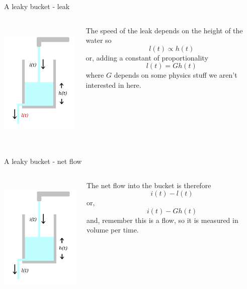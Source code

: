 \documentclass{beamer}
\newcommand{\crish}{\color{reddish}}
\newcommand{\cbla}{\color{black}}
\begin{document}
\begin{frame}{A leaky bucket - leak}
\begin{columns}
\begin{column}{0.5\textwidth}
  \begin{center}
     \includegraphics[height=6cm]{glass_l_red.png}      
     \end{center}
\end{column}
\begin{column}{0.5\textwidth}
  The speed of the leak depends on the height of the water so\crish
  $$l(t)\propto h(t)$$
  \cbla{}or, adding a constant of proportionality\crish
  $$l(t)=Gh(t)$$
  \cbla{}where \crish{}$G$\cbla{} depends on some physics stuff we aren't interested in here.


  
\end{column}
\end{columns}
\end{frame}


\begin{frame}{A leaky bucket - net flow}
\begin{columns}
\begin{column}{0.5\textwidth}
  \begin{center}
     \includegraphics[height=6cm]{glass_notation.png}      
     \end{center}
\end{column}
\begin{column}{0.5\textwidth}
  The net flow into the bucket is therefore\crish
  $$i(t)- l(t)$$
  \cbla{}or,\crish{} 
  $$i(t)-Gh(t)$$
  \cbla{}and, remember this is a flow, so it is measured in volume per time.

\end{column}
\end{columns}
\end{frame}
\end{document}
